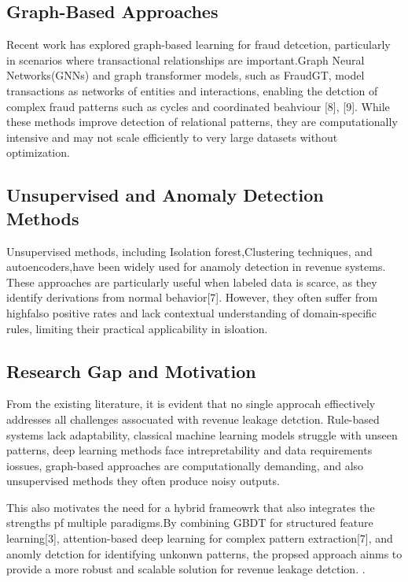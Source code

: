 \documentclass[conference]{IEEEtran}
\begin{document}
\subsection{Graph-Based Approaches}
Recent work has explored graph-based learning for fraud detcetion, particularly in scenarios where transactional relationships are important.Graph Neural Networks(GNNs) and graph transformer models, such as FraudGT, model transactions as networks of entities and interactions, enabling the detction of complex fraud patterns such as cycles and coordinated beahviour [8], [9]. While these methods improve detection of relational patterns, they are computationally intensive and may not scale efficiently to very large datasets without optimization.


\subsection{Unsupervised and Anomaly Detection Methods}
Unsupervised methods, including Isolation forest,Clustering techniques, and autoencoders,have been widely used for anamoly detection in revenue systems. These approaches are particularly useful when labeled data is scarce, as they identify derivations from normal behavior[7]. However, they often suffer from highfalso positive rates and lack contextual understanding of domain-specific rules, limiting their practical applicability in isloation.

\subsection{Research Gap and Motivation}
From the existing literature, it is evident that no single approcah effiectively addresses all challenges assocuated with revenue leakage detction. Rule-based systems lack adaptability, classical machine learning models struggle with unseen patterns, deep learning methods face intrepretability and data requirements iossues, graph-based approaches are computationally demanding, and also unsupervised methods they often produce noisy outputs.

This also motivates the need for a hybrid frameowrk that also integrates the strengths pf multiple paradigms.By combining GBDT for structured feature learning[3], attention-based deep learning for complex pattern extraction[7], and anomly detction for identifying unkonwn patterns, the propsed approach ainms to provide a more robust and scalable solution for revenue leakage detction.
.
\end{document}
